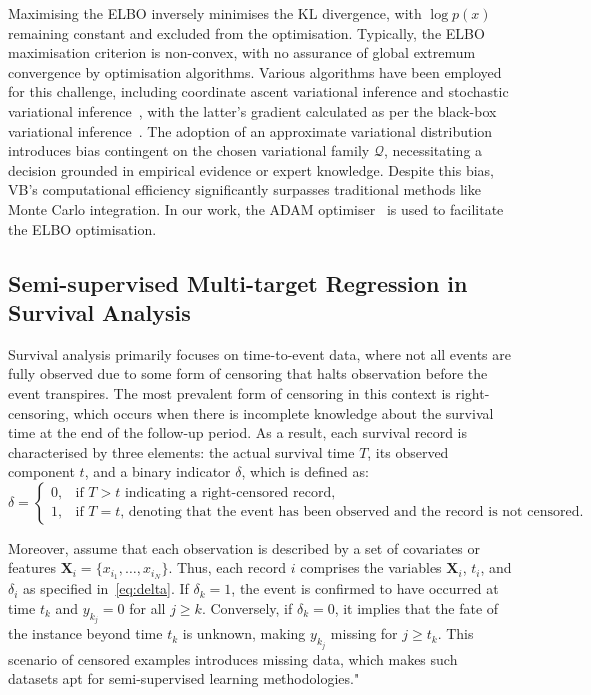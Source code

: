 \documentclass[3p,review,authoryear]{elsarticle}
\begin{document}
Maximising the ELBO inversely minimises the KL divergence, with $\log p(x)$ remaining constant and excluded from the optimisation.
Typically, the ELBO maximisation criterion is non-convex, with no assurance of global extremum convergence by optimisation algorithms.
Various algorithms have been employed for this challenge, including coordinate ascent variational inference and stochastic variational inference~\cite{hoffman2013stochastic}, with the latter's gradient calculated as per the black-box variational inference~\cite{sashank2018convergence}.
The adoption of an approximate variational distribution introduces bias contingent on the chosen variational family $\mathcal{Q}$, necessitating a decision grounded in empirical evidence or expert knowledge.
Despite this bias, VB's computational efficiency significantly surpasses traditional methods like Monte Carlo integration.
In our work, the ADAM optimiser~\citep{kingma2014adam} is used to facilitate the ELBO optimisation.


\subsection{Semi-supervised Multi-target Regression in Survival Analysis}

Survival analysis primarily focuses on time-to-event data, where not all events are fully observed due to some form of censoring that halts observation before the event transpires.
The most prevalent form of censoring in this context is right-censoring, which occurs when there is incomplete knowledge about the survival time at the end of the follow-up period.
As a result, each survival record is characterised by three elements: the actual survival time $T$, its observed component $t$, and a binary indicator $\delta$, which is defined as:
\begin{equation}
\delta = \begin{cases}
0, & \text{if } T>t \text{ indicating a right-censored record},\\
1, & \text{if } T=t \text{, denoting that the event has been observed and the record is not censored}.
\end{cases}
\label{eq:delta}
\end{equation}

Moreover, assume that each observation is described by a set of covariates or features $\mathbf{X}_i=\{x_{i_1},\ldots,x_{i_N}\}$.
Thus, each record $i$ comprises the variables $\mathbf{X}_i$, $t_i$, and $\delta_i$ as specified in~\eqref{eq:delta}.
If $\delta_k=1$, the event is confirmed to have occurred at time $t_k$ and $y_{k_j} = 0$ for all $j \geq{k}$.
Conversely, if $\delta_k=0$, it implies that the fate of the instance beyond time $t_k$ is unknown, making $y_{k_j}$ missing for $j \geq{t_k}$.
This scenario of censored examples introduces missing data, which makes such datasets apt for semi-supervised learning methodologies."
\end{document}
